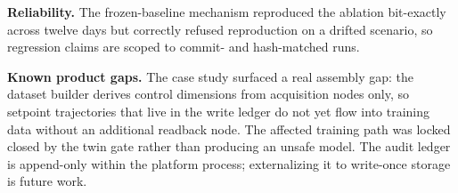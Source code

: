 \textbf{Reliability.} The frozen-baseline mechanism reproduced the
ablation bit-exactly across twelve days but correctly refused
reproduction on a drifted scenario, so regression claims are scoped to
commit- and hash-matched runs.

\textbf{Known product gaps.} The case study surfaced a real assembly
gap: the dataset builder derives control dimensions from acquisition
nodes only, so setpoint trajectories that live in the write ledger do
not yet flow into training data without an additional readback node.
The affected training path was locked closed by the twin gate rather
than producing an unsafe model. The audit ledger is append-only within
the platform process; externalizing it to write-once storage is future
work.
